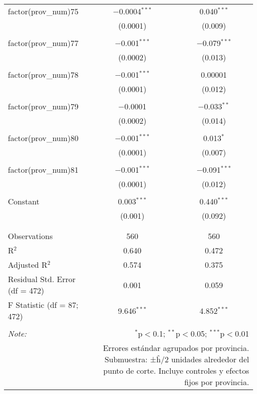 \begin{table}[ht!]
\begin{tabular}{@{\extracolsep{5pt}}lcc}
 factor(prov\_num)75 & $-$0.0004$^{***}$ & 0.040$^{***}$ \\ 
  & (0.0001) & (0.009) \\ 
  & & \\ 
 factor(prov\_num)77 & $-$0.001$^{***}$ & $-$0.079$^{***}$ \\ 
  & (0.0002) & (0.013) \\ 
  & & \\ 
 factor(prov\_num)78 & $-$0.001$^{***}$ & 0.00001 \\ 
  & (0.0001) & (0.012) \\ 
  & & \\ 
 factor(prov\_num)79 & $-$0.0001 & $-$0.033$^{**}$ \\ 
  & (0.0002) & (0.014) \\ 
  & & \\ 
 factor(prov\_num)80 & $-$0.001$^{***}$ & 0.013$^{*}$ \\ 
  & (0.0001) & (0.007) \\ 
  & & \\ 
 factor(prov\_num)81 & $-$0.001$^{***}$ & $-$0.091$^{***}$ \\ 
  & (0.0001) & (0.012) \\ 
  & & \\ 
 Constant & 0.003$^{***}$ & 0.440$^{***}$ \\ 
  & (0.001) & (0.092) \\ 
  & & \\ 
\hline \\[-1.8ex] 
Observations & 560 & 560 \\ 
R$^{2}$ & 0.640 & 0.472 \\ 
Adjusted R$^{2}$ & 0.574 & 0.375 \\ 
Residual Std. Error (df = 472) & 0.001 & 0.059 \\ 
F Statistic (df = 87; 472) & 9.646$^{***}$ & 4.852$^{***}$ \\ 
\hline 
\hline \\[-1.8ex] 
\textit{Note:}  & \multicolumn{2}{r}{$^{*}$p$<$0.1; $^{**}$p$<$0.05; $^{***}$p$<$0.01} \\ 
 & \multicolumn{2}{r}{Errores estándar agrupados por provincia. Submuestra: ±ĥ/2 unidades alrededor del punto de corte. Incluye controles y efectos fijos por provincia.} \\ 
\end{tabular} 
\end{table} 
